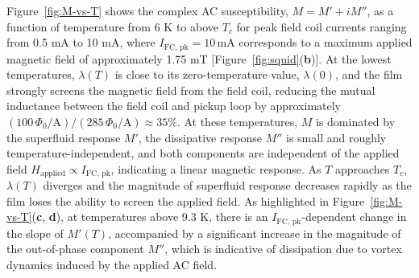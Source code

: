 \documentclass[%
 reprint,
 superscriptaddress,
 amsmath,
 amssymb,
 amsfonts,
 aps,
 prb,
]{revtex4-2}
\newcommand{\Tc}{T_c}
\newcommand{\FC}{\mathrm{FC}}
\newcommand{\pk}{\mathrm{pk}}
\newcommand{\mA}{\mathrm{mA}}
\begin{document}
Figure~\ref{fig:M-vs-T} shows the complex AC susceptibility, $M=M'+iM''$, as a function of temperature from 6 K to above $\Tc$ for peak field coil currents ranging from 0.5 mA to 10 mA, where $I_{\FC,\,\pk} = 10\,\mA$ corresponds to a maximum applied magnetic field of approximately 1.75 mT [Figure~\ref{fig:squid}({\bf b})]. At the lowest temperatures, $\lambda(T)$ is close to its zero-temperature value, $\lambda(0)$, and the film strongly screens the magnetic field from the field coil, reducing the mutual inductance between the field coil and pickup loop by approximately $(100\,\Phi_0/\mathrm{A})/(285\,\Phi_0/\mathrm{A}) \approx 35\%$. At these temperatures, $M$ is dominated by the superfluid response $M'$, the dissipative response $M''$ is small and roughly temperature-independent, and both components are independent of the applied field $H_\mathrm{applied}\propto I_{\FC,\,\pk}$, indicating a linear magnetic response. As $T$ approaches $\Tc$, $\lambda(T)$ diverges and the magnitude of superfluid response decreases rapidly as the film loses the ability to screen the applied field. As highlighted in Figure~\ref{fig:M-vs-T}({\bf c}, {\bf d}), at temperatures above 9.3 K, there is an $I_{\FC,\,\pk}$-dependent change in the slope of $M'(T)$, accompanied by a significant increase in the magnitude of the out-of-phase component $M''$, which is indicative of dissipation due to vortex dynamics induced by the applied AC field.

\end{document}
